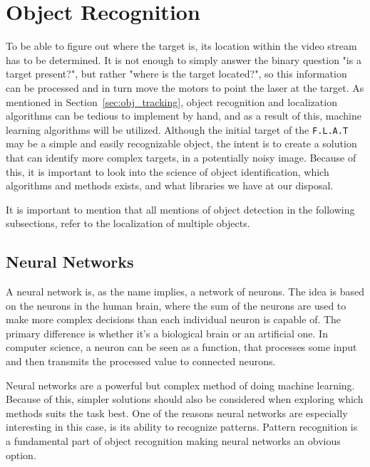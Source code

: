 \section{Object Recognition}
To be able to figure out where the target is, its location within the video stream has to be determined.
It is not enough to simply answer the binary question "is a target present?", but rather "where is the target located?", so this information can be processed and in turn move the motors to point the laser at the target.
As mentioned in Section~\ref{sec:obj_tracking}, object recognition and localization algorithms can be tedious to implement by hand, and as a result of this, machine learning algorithms will be utilized.
Although the initial target of the \texttt{F.L.A.T} may be a simple and easily recognizable object, the intent is to create a solution that can identify more complex targets, in a potentially noisy image.
Because of this, it is important to look into the science of object identification, which algorithms and methods exists, and what libraries we have at our disposal.

It is important to mention that all mentions of object detection in the following subsections, refer to the localization of multiple objects.

\subsection{Neural Networks}
A neural network is, as the name implies, a network of neurons.
The idea is based on the neurons in the human brain, where the sum of the neurons are used to make more complex decisions than each individual neuron is capable of.
The primary difference is whether it's a biological brain or an artificial one. 
In computer science, a neuron can be seen as a function, that processes some input and then transmits the processed value to connected neurons.

Neural networks are a powerful but complex method of doing machine learning.
Because of this, simpler solutions should also be considered when exploring which methods suits the task best.
One of the reasons neural networks are especially interesting in this case, is its ability to recognize patterns.
Pattern recognition is a fundamental part of object recognition making neural networks an obvious option.


